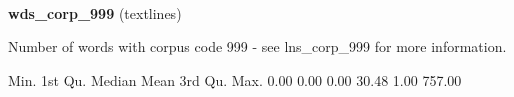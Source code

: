 \documentclass[]{article}
\newenvironment{Shaded}{\begin{snugshade}}{\end{snugshade}}
\newcommand{\FloatTok}[1]{\textcolor[rgb]{0.00,0.00,0.81}{{#1}}}
\newcommand{\NormalTok}[1]{{#1}}
\begin{document}
~

\vspace{1em}

\textbf{wds\_corp\_999} (textlines)

Number of words with corpus code 999 - see lns\_corp\_999 for more
information.

\begin{Shaded}
\begin{Highlighting}[]
   \NormalTok{Min. 1st Qu.  Median    Mean 3rd Qu.    Max. }
   \FloatTok{0.00}    \FloatTok{0.00}    \FloatTok{0.00}   \FloatTok{30.48}    \FloatTok{1.00}  \FloatTok{757.00} 
\end{Highlighting}
\end{Shaded}

~

\vspace{1em}
\end{document}
